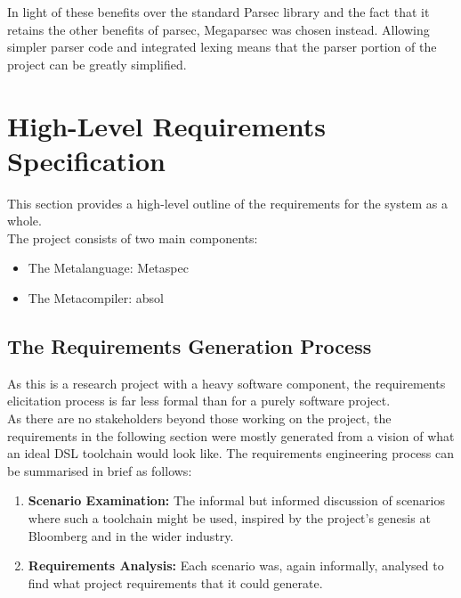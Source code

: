 In light of these benefits over the standard Parsec library and the fact that it retains the other benefits of parsec, Megaparsec was chosen instead. 
Allowing simpler parser code and integrated lexing means that the parser portion of the project can be greatly simplified. 



\section{High-Level Requirements Specification} %
\label{sec:high_level_requirements_specification}
This section provides a high-level outline of the requirements for the system as a whole. \\

The project consists of two main components:
\begin{itemize}
    \item The Metalanguage: Metaspec
    \item The Metacompiler: \gls{absol}
\end{itemize}

\subsection{The Requirements Generation Process} %
\label{sub:the_requirements_generation_process}
As this is a research project with a heavy software component, the requirements elicitation process is far less formal than for a purely software project.\\

As there are no stakeholders beyond those working on the project, the requirements in the following section were mostly generated from a vision of what an ideal DSL toolchain would look like. 
The requirements engineering process can be summarised in brief as follows:
\begin{enumerate}
    \item \textbf{Scenario Examination:} The informal but informed discussion of scenarios where such a toolchain might be used, inspired by the project's genesis at Bloomberg and in the wider industry.
    \item \textbf{Requirements Analysis:} Each scenario was, again informally, analysed to find what project requirements that it could generate.
\end{enumerate}

